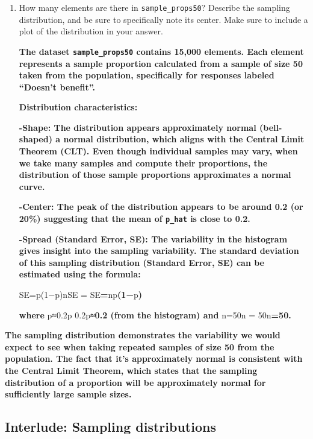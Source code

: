 \documentclass[
]{article}
\begin{document}
\begin{enumerate}
\def\labelenumi{\arabic{enumi}.}
\setcounter{enumi}{3}
\item
  How many elements are there in \texttt{sample\_props50}? Describe the
  sampling distribution, and be sure to specifically note its center.
  Make sure to include a plot of the distribution in your answer.

  \textbf{The dataset \texttt{sample\_props50} contains 15,000 elements.
  Each element represents a sample proportion calculated from a sample
  of size 50 taken from the population, specifically for responses
  labeled ``Doesn't benefit''.}

  \textbf{Distribution characteristics:}

  \textbf{-Shape: The distribution appears approximately normal
  (bell-shaped) a normal distribution, which aligns with the Central
  Limit Theorem (CLT). Even though individual samples may vary, when we
  take many samples and compute their proportions, the distribution of
  those sample proportions approximates a normal curve.}

  \textbf{-Center: The peak of the distribution appears to be around 0.2
  (or 20\%) suggesting that the mean of \texttt{p\_hat} is close to
  0.2.}

  \textbf{-Spread (Standard Error, SE): The variability in the histogram
  gives insight into the sampling variability. The standard deviation of
  this sampling distribution (Standard Error, SE) can be estimated using
  the formula:}

  SE=p(1−p)nSE =
  SE\textbf{=}np\textbf{(1−}p\textbf{)\hspace{0pt}\hspace{0pt}}

  \textbf{where} p≈0.2p \approx 0.2p\textbf{≈0.2 (from the histogram)
  and} n=50n = 50n\textbf{=50.}
\end{enumerate}

\textbf{The sampling distribution demonstrates the variability we would
expect to see when taking repeated samples of size 50 from the
population. The fact that it's approximately normal is consistent with
the Central Limit Theorem, which states that the sampling distribution
of a proportion will be approximately normal for sufficiently large
sample sizes.}

\subsection{Interlude: Sampling
distributions}\label{interlude-sampling-distributions}
\end{document}
